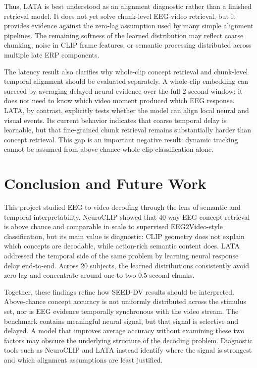 \documentclass{article}
\begin{document}
Thus, LATA is best understood as an alignment diagnostic rather than a finished
retrieval model. It does not yet solve chunk-level EEG-video retrieval, but it
provides evidence against the zero-lag assumption used by many simple alignment
pipelines. The remaining softness of the learned distribution may reflect coarse
chunking, noise in CLIP frame features, or semantic processing distributed
across multiple late ERP components.

The latency result also clarifies why whole-clip concept retrieval and
chunk-level temporal alignment should be evaluated separately. A whole-clip
embedding can succeed by averaging delayed neural evidence over the full
2-second window; it does not need to know which video moment produced which EEG
response. LATA, by contrast, explicitly tests whether the model can align local
neural and visual events. Its current behavior indicates that coarse temporal
delay is learnable, but that fine-grained chunk retrieval remains substantially
harder than concept retrieval. This gap is an important negative result: dynamic
tracking cannot be assumed from above-chance whole-clip classification alone.

\section{Conclusion and Future Work}

This project studied EEG-to-video decoding through the lens of semantic and temporal interpretability. NeuroCLIP showed that 40-way EEG concept retrieval is above chance and comparable in scale to supervised EEG2Video-style classification, but its main value is diagnostic: CLIP geometry does not explain which concepts are decodable, while action-rich semantic content does. LATA addressed the temporal side of the same problem by learning neural response delay end-to-end. Across 20 subjects, the learned distributions consistently avoid zero lag and concentrate around one to two 0.5-second chunks.

Together, these findings refine how SEED-DV results should be interpreted. Above-chance concept accuracy is not uniformly distributed across the stimulus set, nor is EEG evidence temporally synchronous with the video stream. The benchmark contains meaningful neural signal, but that signal is selective and delayed. A model that improves average accuracy without examining these two factors may obscure the underlying structure of the decoding problem. Diagnostic tools such as NeuroCLIP and LATA instead identify where the signal is strongest and which alignment assumptions are least justified.
\end{document}
